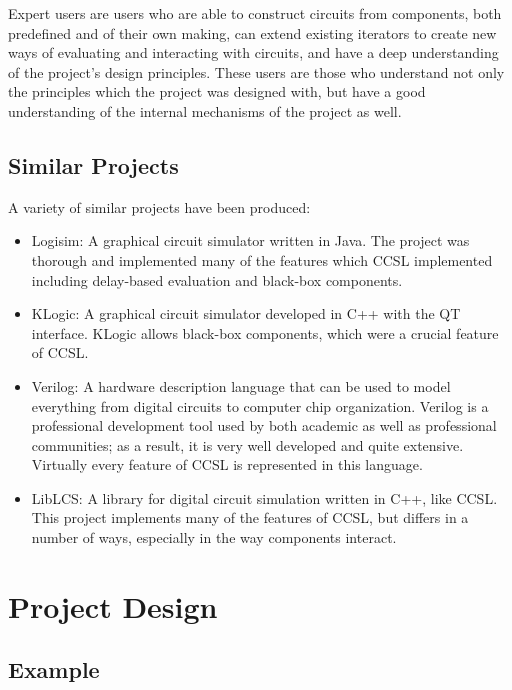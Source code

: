 \documentclass{article}
\begin{document}
Expert users are users who are able to construct circuits from components, both predefined and of their own making, can extend existing iterators to create new ways of evaluating and interacting with circuits, and have a deep understanding of the project's design principles. These users are those who understand not only the principles which the project was designed with, but have a good understanding of the internal mechanisms of the project as well.

\subsection{Similar Projects}

A variety of similar projects have been produced:

\begin{itemize}

\item Logisim: A graphical circuit simulator written in Java. The project was thorough and implemented many of the features which CCSL implemented including delay-based evaluation and black-box components.\cite{Logisim}

\item KLogic: A graphical circuit simulator developed in C++ with the QT interface. KLogic allows black-box components, which were a crucial feature of CCSL.\cite{KLogic}

\item Verilog: A hardware description language that can be used to model everything from digital circuits to computer chip organization. Verilog is a professional development tool used by both academic as well as professional communities; as a result, it is very well developed and quite extensive. Virtually every feature of CCSL is represented in this language.\cite{Verilog}

\item LibLCS: A library for digital circuit simulation written in C++, like CCSL. This project implements many of the features of CCSL, but differs in a number of ways, especially in the way components interact.\cite{libLCS}

\end{itemize}

\section{Project Design}

\subsection{Example}
\end{document}
